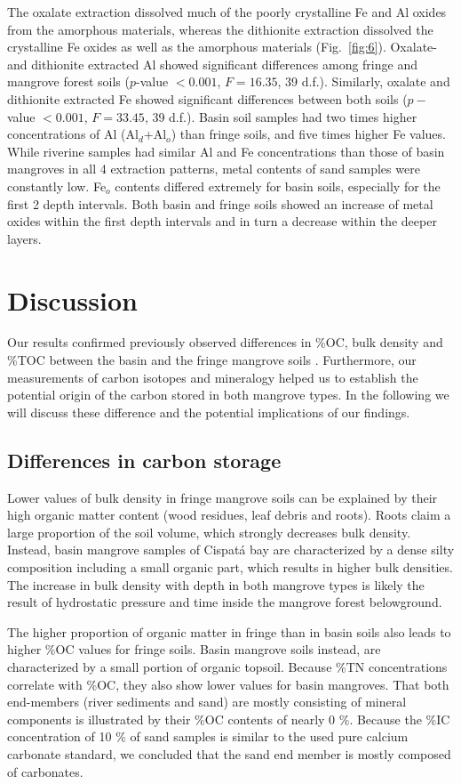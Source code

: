 The oxalate extraction dissolved much of the poorly crystalline Fe and Al oxides from the amorphous materials, whereas the dithionite extraction dissolved the crystalline Fe oxides as well as the amorphous materials \mbox{(Fig. \ref{fig:6})}. Oxalate- and dithionite extracted Al showed significant differences among fringe and mangrove forest soils ($p$-value $< 0.001$, $F = 16.35$, 39 d.f.). Similarly, oxalate and dithionite extracted Fe showed significant differences between both soils ($p-$value $< 0.001$, $F = 33.45$, 39 d.f.).
Basin soil samples had two times higher concentrations of Al (Al$_d$+Al$_o$) than fringe soils, and five times higher Fe values. While riverine samples had similar Al and Fe concentrations than those of basin mangroves in all 4 extraction patterns, metal contents of sand samples were constantly low. Fe$_o$ contents differed extremely for basin soils, especially for the first 2 depth intervals. Both basin and fringe soils showed an increase of metal oxides within the first depth intervals and in turn a decrease within the deeper layers.

\section{Discussion}
Our results confirmed previously observed differences in \%OC, bulk density and \%TOC between the basin and the fringe mangrove soils \citep{Bolivar2015}.  Furthermore, our measurements of carbon isotopes and mineralogy helped us to establish the potential origin of the carbon stored in both mangrove types. In the following we will discuss these difference and the potential implications of our findings. 

\subsection{Differences in carbon storage}
Lower values of bulk density in fringe mangrove soils can be explained by their high organic matter content (wood residues, leaf debris and roots). Roots claim a large proportion of the soil volume, which strongly decreases bulk density. Instead, basin mangrove samples of Cispat\'{a} bay are characterized by a dense silty composition including a small organic part, which results in higher bulk densities. The increase in bulk density with depth in both mangrove types is likely the result of hydrostatic pressure and time inside the mangrove forest belowground.\par
The higher proportion of organic matter in fringe than in basin soils also leads to higher \%OC values for fringe soils. Basin mangrove soils instead, are characterized by a small portion of organic topsoil. Because \%TN concentrations correlate with \%OC, they also show lower values for basin mangroves. That both end-members (river sediments and sand) are mostly consisting of mineral components is illustrated by their \%OC contents of nearly 0 \%. Because the \%IC concentration of 10 \% of sand samples is similar to the used pure calcium carbonate standard, we concluded that the sand end member is mostly composed of carbonates.

